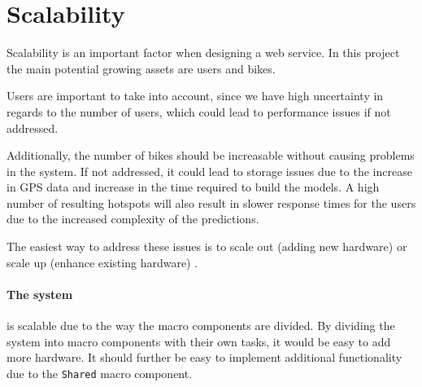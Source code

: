 \section{Scalability}
Scalability is an important factor when designing a web service. In this project the main potential growing assets are users and bikes.

Users are important to take into account, since we have high uncertainty in regards to the number of users, which could lead to performance issues if not addressed.

Additionally, the number of bikes should be increasable without causing problems in the system. If not addressed, it could lead to storage issues due to the increase in GPS data and increase in the time required to build the models.
A high number of resulting hotspots will also result in slower response times for the users due to the increased complexity of the predictions.

The easiest way to address these issues is to scale out (adding new hardware) or scale up (enhance existing hardware) \cite{michael2007scale}. 

\paragraph{The system} is scalable due to the way the macro components are divided. By dividing the system into macro components with their own tasks, it would be easy to add more hardware. It should further be easy to implement additional functionality due to the \texttt{Shared} macro component.

